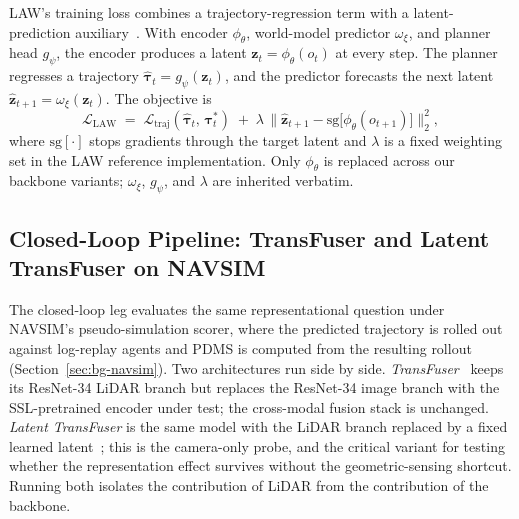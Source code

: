 LAW's training loss combines a trajectory-regression term with a latent-prediction auxiliary~\cite{li-law-2024}. With encoder $\phi_\theta$, world-model predictor $\omega_\xi$, and planner head $g_\psi$, the encoder produces a latent $\mathbf{z}_t = \phi_\theta(o_t)$ at every step. The planner regresses a trajectory $\hat{\boldsymbol\tau}_t = g_\psi(\mathbf{z}_t)$, and the predictor forecasts the next latent $\hat{\mathbf{z}}_{t+1} = \omega_\xi(\mathbf{z}_t)$. The objective is
\begin{equation}
\label{eq:law-loss}
\mathcal{L}_\text{LAW} \;=\; \mathcal{L}_\text{traj}(\hat{\boldsymbol\tau}_t,\, \boldsymbol\tau^{\ast}_t) \;+\; \lambda\,\bigl\lVert \hat{\mathbf{z}}_{t+1} - \mathrm{sg}\bigl[\phi_\theta(o_{t+1})\bigr] \bigr\rVert_2^2,
\end{equation}
where $\mathrm{sg}[\cdot]$ stops gradients through the target latent and $\lambda$ is a fixed weighting set in the LAW reference implementation. Only $\phi_\theta$ is replaced across our backbone variants; $\omega_\xi$, $g_\psi$, and $\lambda$ are inherited verbatim.

\subsection{Closed-Loop Pipeline: TransFuser and Latent TransFuser on NAVSIM}
\label{sec:meth-phase1-tf}

The closed-loop leg evaluates the same representational question under NAVSIM's pseudo-simulation scorer, where the predicted trajectory is rolled out against log-replay agents and PDMS is computed from the resulting rollout (Section~\ref{sec:bg-navsim}). Two architectures run side by side. \emph{TransFuser}~\cite{chitta-transfuser-2023} keeps its ResNet-34 LiDAR branch but replaces the ResNet-34 image branch with the SSL-pretrained encoder under test; the cross-modal fusion stack is unchanged. \emph{Latent TransFuser} is the same model with the LiDAR branch replaced by a fixed learned latent~\cite{dauner-navsim-2024}; this is the camera-only probe, and the critical variant for testing whether the representation effect survives without the geometric-sensing shortcut. Running both isolates the contribution of LiDAR from the contribution of the backbone.

